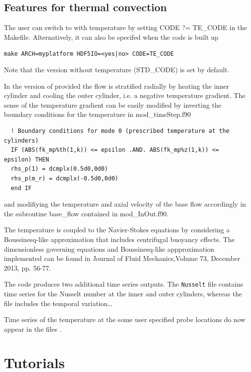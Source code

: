 \documentclass[a4paper, 11pt, DIV=11]{scrartcl}
\begin{document}
\subsection{Features for thermal convection}
\label{sec:thermalConvection}

The user can switch to \nsc with temperature by setting CODE ?= TE\_CODE
in the Makefile. Alternatively, it can also be specifed when the code is built up

\verb+make ARCH=myplatform HDF5IO=<yes|no> CODE=TE_CODE+

\noindent Note that the version without temperature (STD\_CODE) is set by default.

\noindent In the version of \nsc provided the flow is stratified
radially by heating the inner cylinder and cooling the
outer cylinder, i.e. a negative temperature gradient.
The sense of the temperature gradient can be easily
modified by inverting the boundary conditions for
the temperature in mod\_timeStep.f90
\begin{verbatim}   
  ! Boundary conditions for mode 0 (prescribed temperature at the cylinders)  
  IF (ABS(fk_mp%th(1,k)) <= epsilon .AND. ABS(fk_mp%z(1,k)) <= epsilon) THEN  
  rhs_p(1) = dcmplx(0.5d0,0d0) 
  rhs_p(m_r) = dcmplx(-0.5d0,0d0) 
  end IF  
\end{verbatim}
\noindent and modifiying the temperature and axial velocity of the base flow
accordingly in the subroutine base\_flow contained in mod\_InOut.f90.

\noindent The temperature is coupled to the Navier-Stokes equations by considering a
Boussinesq-like approximation that includes centrifugal buoyancy
effects. The dimensionless governing equations and
Boussinesq-like appproximation implemented can be found
in Journal of Fluid Mechanics,Volume 73, December 2013, pp. 56-77.

\noindent The code produces two additional time series outputs.
The \verb+Nusselt+ file contains time series for the Nusselt number
at the inner and outer cylinders, whereas the file 
includes the temporal variation\dots

Time series of the temperature at the some user specified probe locations do now appear
in the files .



\section{Tutorials}
\label{sec:tutorials}
\end{document}

